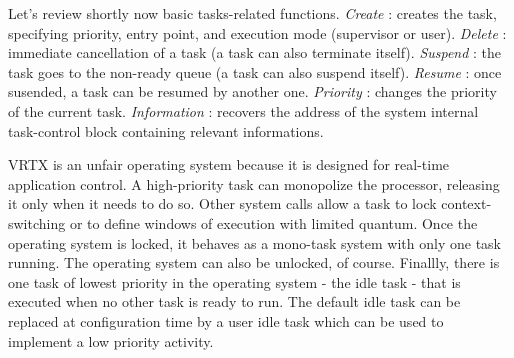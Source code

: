 \documentclass[10pt]{report}
\begin{document}
Let's review shortly now basic tasks-related functions. {\em Create} : creates the task, specifying priority, entry point, 
and execution mode (supervisor or user). {\em Delete} : immediate cancellation of a 
task (a task can also terminate itself). {\em Suspend} : the task goes 
to the non-ready queue (a task can also suspend itself). {\em Resume} : once susended, a task 
can be resumed by another one. {\em Priority} : changes the priority of the current task. {\em Information} : recovers 
the address of the system internal task-control block containing relevant informations.

VRTX is an unfair operating system because it is designed for 
real-time application control. A high-priority task can 
monopolize the processor, releasing it only when it needs to do 
so. Other system calls allow a task to lock context-switching or 
to define windows of execution with limited quantum. Once the 
operating system is locked, it behaves as a mono-task system with 
only one task running. The operating system can also be unlocked, 
of course. Finallly, there is one task of lowest priority in the 
operating system - the idle task - that is executed when no other 
task is ready to run. The default idle task can be replaced at 
configuration time by a user idle task which can be used to 
implement a low priority activity.
\end{document}
